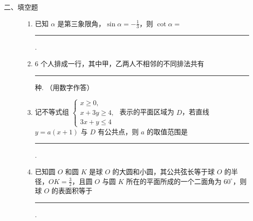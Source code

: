 \begin{description}

    \item[二、填空题]

    \begin{enumerate}[leftmargin=5pt]

      \addtocounter{enumi}{+12}

        \item 已知 \(\alpha\) 是第三象限角，\(\sin\alpha=-\frac{1}{3}\)，则 \(\cot\alpha=\)\rule[-0.3ex]{3em}{0.4pt}.

        \item \(6\) 个人排成一行，其中甲，乙两人不相邻的不同排法共有\rule[-0.3ex]{3em}{0.4pt} 种. （用数字作答）

        \item 记不等式组 \(\begin{cases}
x\geqslant0,\\
x+3y\geqslant4,\\
3x+y\leqslant4
\end{cases}\) 表示的平面区域为 \(D\)，若直线 \(y=a(x+1)\) 与 \(D\) 有公共点，则 \(a\) 的取值范围是\rule[-0.3ex]{3em}{0.4pt}.

        \item 已知圆 \(O\) 和圆 \(K\) 是球 \(O\) 的大圆和小圆，其公共弦长等于球 \(O\) 的半径，\(OK=\frac{3}{2}\)，且圆 \(O\) 与圆 \(K\) 所在的平面所成的一个二面角为 \(60^{\circ}\)，则球 \(O\) 的表面积等于\rule[-0.3ex]{3em}{0.4pt}.

    \end{enumerate}

\end{description}

